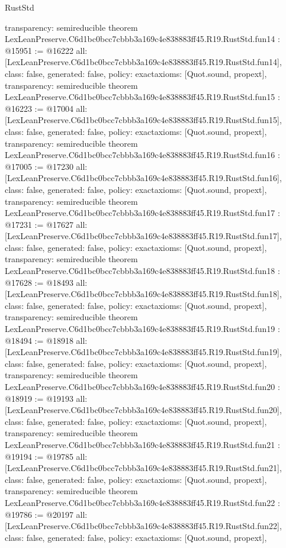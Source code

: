 \begin{lexlean}{RustStd}
\begin{coremodule}
{  transparency: semireducible
}
theorem LexLeanPreserve.C6d1bc0bcc7cbbb3a169c4e838883ff45.R19.RustStd.fun14 : @15951 := @16222 {
  all: [LexLeanPreserve.C6d1bc0bcc7cbbb3a169c4e838883ff45.R19.RustStd.fun14],
  class: false,
  generated: false,
  policy: exact{axioms: [Quot.sound, propext]},
  transparency: semireducible
}
theorem LexLeanPreserve.C6d1bc0bcc7cbbb3a169c4e838883ff45.R19.RustStd.fun15 : @16223 := @17004 {
  all: [LexLeanPreserve.C6d1bc0bcc7cbbb3a169c4e838883ff45.R19.RustStd.fun15],
  class: false,
  generated: false,
  policy: exact{axioms: [Quot.sound, propext]},
  transparency: semireducible
}
theorem LexLeanPreserve.C6d1bc0bcc7cbbb3a169c4e838883ff45.R19.RustStd.fun16 : @17005 := @17230 {
  all: [LexLeanPreserve.C6d1bc0bcc7cbbb3a169c4e838883ff45.R19.RustStd.fun16],
  class: false,
  generated: false,
  policy: exact{axioms: [Quot.sound, propext]},
  transparency: semireducible
}
theorem LexLeanPreserve.C6d1bc0bcc7cbbb3a169c4e838883ff45.R19.RustStd.fun17 : @17231 := @17627 {
  all: [LexLeanPreserve.C6d1bc0bcc7cbbb3a169c4e838883ff45.R19.RustStd.fun17],
  class: false,
  generated: false,
  policy: exact{axioms: [Quot.sound, propext]},
  transparency: semireducible
}
theorem LexLeanPreserve.C6d1bc0bcc7cbbb3a169c4e838883ff45.R19.RustStd.fun18 : @17628 := @18493 {
  all: [LexLeanPreserve.C6d1bc0bcc7cbbb3a169c4e838883ff45.R19.RustStd.fun18],
  class: false,
  generated: false,
  policy: exact{axioms: [Quot.sound, propext]},
  transparency: semireducible
}
theorem LexLeanPreserve.C6d1bc0bcc7cbbb3a169c4e838883ff45.R19.RustStd.fun19 : @18494 := @18918 {
  all: [LexLeanPreserve.C6d1bc0bcc7cbbb3a169c4e838883ff45.R19.RustStd.fun19],
  class: false,
  generated: false,
  policy: exact{axioms: [Quot.sound, propext]},
  transparency: semireducible
}
theorem LexLeanPreserve.C6d1bc0bcc7cbbb3a169c4e838883ff45.R19.RustStd.fun20 : @18919 := @19193 {
  all: [LexLeanPreserve.C6d1bc0bcc7cbbb3a169c4e838883ff45.R19.RustStd.fun20],
  class: false,
  generated: false,
  policy: exact{axioms: [Quot.sound, propext]},
  transparency: semireducible
}
theorem LexLeanPreserve.C6d1bc0bcc7cbbb3a169c4e838883ff45.R19.RustStd.fun21 : @19194 := @19785 {
  all: [LexLeanPreserve.C6d1bc0bcc7cbbb3a169c4e838883ff45.R19.RustStd.fun21],
  class: false,
  generated: false,
  policy: exact{axioms: [Quot.sound, propext]},
  transparency: semireducible
}
theorem LexLeanPreserve.C6d1bc0bcc7cbbb3a169c4e838883ff45.R19.RustStd.fun22 : @19786 := @20197 {
  all: [LexLeanPreserve.C6d1bc0bcc7cbbb3a169c4e838883ff45.R19.RustStd.fun22],
  class: false,
  generated: false,
  policy: exact{axioms: [Quot.sound, propext]},
}
\end{coremodule}
\end{lexlean}
